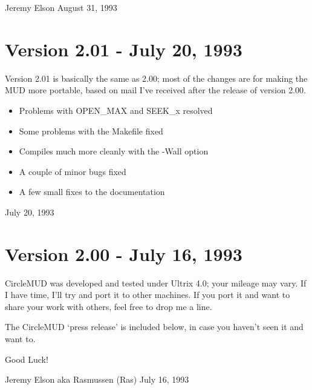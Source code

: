 \documentclass[11pt]{article}
\begin{document}
Jeremy Elson\newline
August 31, 1993

\section{Version 2.01 - July 20, 1993}
Version 2.01 is basically the same as 2.00; most of the changes are for making the MUD more portable, based on mail I've received after the release of version 2.00.
\begin{itemize}
\item Problems with OPEN\_MAX and SEEK\_x resolved
\item Some problems with the Makefile fixed
\item Compiles much more cleanly with the -Wall option
\item A couple of minor bugs fixed
\item A few small fixes to the documentation
\end{itemize}
July 20, 1993

\section{Version 2.00 - July 16, 1993}
CircleMUD was developed and tested under Ultrix 4.0; your mileage may vary. If I have time, I'll try and port it to other machines.  If you port it and want to share your work with others, feel free to drop me a line.
\par
The CircleMUD `press release' is included below, in case you haven't seen it and want to.
\par
Good Luck!
\par
Jeremy Elson aka Rasmussen (Ras)\newline
July 16, 1993
\end{document}
